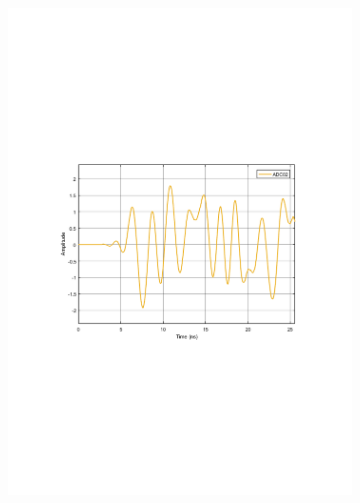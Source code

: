 \begin{refsection}
\begin{figure}[h!]
\centering
\begin{subfigure}{.5\textwidth}
  \centering
  \includegraphics[width=\linewidth]{./sdf/dsp_laser_phase_compensation/figures/S21_td_8bits.pdf}
  \caption{}
  \label{fig:sub1}
\end{subfigure}%
\begin{subfigure}{.5\textwidth}
  \centering

\end{subfigure}
\end{figure}
\end{refsection}
